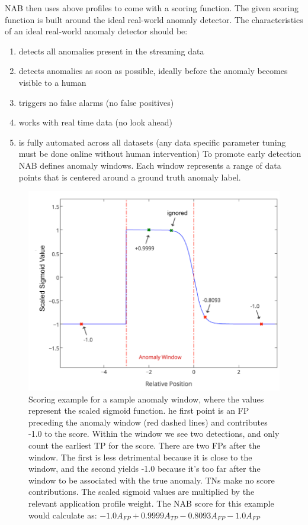 \documentclass[12pt]{article}
\begin{document}
NAB then uses above profiles to come with a scoring function. The given scoring function is built around the ideal real-world anomaly detector. The characteristics of an ideal real-world anomaly detector should be:
\begin{enumerate}
\item detects all anomalies present in the streaming data
\item detects anomalies as soon as possible, ideally before
the anomaly becomes visible to a human
\item triggers no false alarms (no false positives)
\item works with real time data (no look ahead)
\item is fully automated across all datasets (any data
specific parameter tuning must be done online without human
intervention)
To promote early detection NAB defines anomaly
windows. Each window represents a range of data points that is
centered around a ground truth anomaly label.
\end{enumerate} 
\begin{figure}[H]
\centering
        \includegraphics[width=\textwidth]{images/nabScoringExample.png}
    \caption{Scoring example for a sample anomaly window, where the values
represent the scaled sigmoid function. he first
point is an FP preceding the anomaly window (red dashed lines) and
contributes -1.0 to the score. Within the window we see two detections, and
only count the earliest TP for the score. There are two FPs after the window.
The first is less detrimental because it is close to the window, and the second
yields -1.0 because it’s too far after the window to be associated with the true
anomaly. TNs make no score contributions. The scaled sigmoid values are
multiplied by the relevant application profile weight. The NAB score for this example would calculate as: $-1.0A_{FP} + 0.9999A_{TP} - 0.8093A_{FP} - 1.0A_{FP} $}
    \label{nabSigmoidScoringFunction}
\end{figure}
\end{document}
